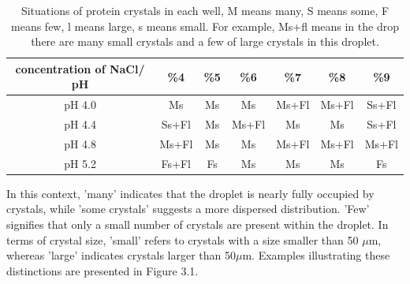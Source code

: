 \documentclass[a4paper,english,12pt,bibliography=totoc]{scrreprt}
\begin{document}
\begin{table}[h]
\centering
\begin{tabular}{|c|c|c|c|c|c|c|}
  \hline
   concentration of NaCl/ pH& \%4 & \%5 & \%6 & \%7 &\%8 & \%9 \\
    \hline
	pH 4.0 &Ms &Ms & Ms& Ms+Fl &Ms+Fl &Ss+Fl \\
  \hline
  	pH 4.4 &Ss+Fl &Ms &Ms+Fl &Ms &Ms &Ss+Fl \\
  \hline
        pH 4.8 &Ms+Fl &Ms &Ms & Ms+Fl&Ms+Fl & Ms+Fl\\
  \hline
        pH 5.2 &Fs+Fl &Fs & Ms &Ms &Ms &Fs \\
  \hline
\end{tabular}
\caption{Situations of protein crystals in each well, M means many, S means some, F means few, l means large, s means small. For example, Ms+fl means in the drop there are many small crystals and a few of large crystals in this droplet.}
\end{table}


In this context, 'many' indicates that the droplet is nearly fully occupied by crystals, while 'some crystals' suggests a more dispersed distribution. 'Few' signifies that only a small number of crystals are present within the droplet. In terms of crystal size, 'small' refers to crystals with a size smaller than 50 $\mu$m, whereas 'large' indicates crystals larger than 50$\mu$m. Examples illustrating these distinctions are presented in Figure 3.1.
\end{document}
